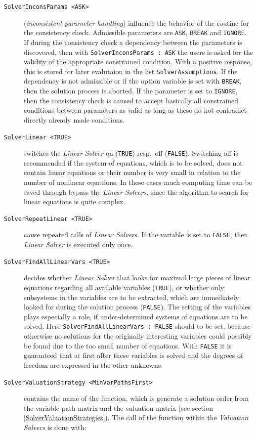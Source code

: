 \begin{description}
\item[{\tt SolverInconsParams <ASK>}] ({\em inconsistent parameter handling}) 
influence the behavior of the routine for the consistency check. Admissible parameters are \verb+ASK+, \verb+BREAK+
and \verb+IGNORE+.
If  during the consistency  check a dependency between the  parameters is discovered, then with \verb+SolverInconsParams : ASK+ the users is asked for the validity of the appropriate constrained condition.  With a positive response, this is stored  for later evalutaion in the list  \verb+SolverAssumptions+. If the dependency is not admissible or if the option variable is set with \verb+BREAK+, then the solution process is aborted. If the parameter is set to \verb+IGNORE+,  then the consistency check is caused to accept basically all constrained conditions between parameters as valid as long as these do not contradict directly already made conditions.
%
\item[{\tt SolverLinear <TRUE>}] 
switches the {\em Linear Solver} on
(\verb+TRUE+) resp.\ off (\verb+FALSE+). Switching off is recommended if the system of equations, which is to be solved, does not contain linear equations or their number is very small in relation to the number of  nonlinear equations. In these cases much computing time can be saved through bypass the {\em Linear Solvers}, since the algorithm to search for linear equations is quite complex.
%
\item[{\tt SolverRepeatLinear <TRUE>}] 
cause repeated calls of {\em Linear Solvers}. If the variable is set to \verb+FALSE+, then  {\em Linear Solver} is executed only once.
%
\item[{\tt SolverFindAllLinearVars <TRUE>}] 
decides whether  {\em 
Linear Solver}  that looks for maximal large  pieces of linear equations regarding all available variables (\verb+TRUE+), or whether only subsystems in the variables are to be extracted, which are immediately looked for during the solution process (\verb+FALSE+). The setting of the variables plays especially a role, if under-determined systems of equations are to be solved. 
\nl Here \verb+SolverFindAllLinearVars : FALSE+ should to be set, because otherwise no solutions for the originally interesting variables could possibly be found due to the too small number of equations. With \verb+FALSE+ it is guaranteed that at first after these variables is solved and the degrees of freedom are expressed in the other unknowns.
%
\item[{\tt SolverValuationStrategy <MinVarPathsFirst>}] 
 contains the name of the function, which is generate a solution order from the variable path matrix and the valuation matrix   (see section \ref{SolverValuationStrategies}). The call of the function within the {\em Valuation Solvers} is done with:

\end{description}
